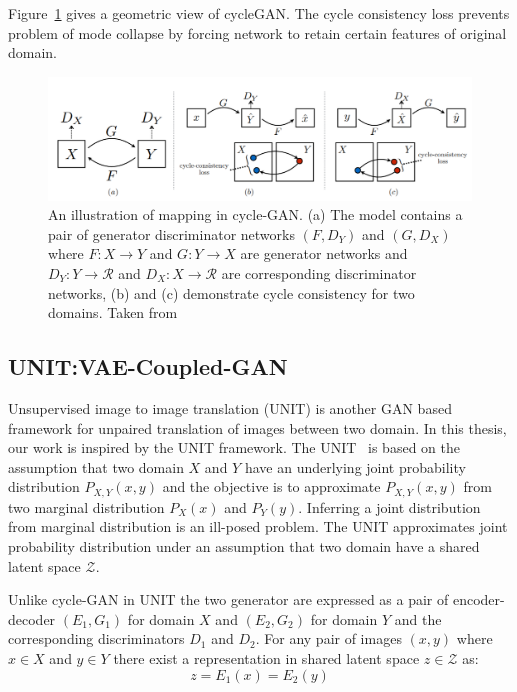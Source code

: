 Figure~\ref{fig:cycle_gan} gives a geometric view of cycleGAN. The cycle consistency loss prevents problem of mode collapse by forcing network to retain certain features of original domain.

\begin{figure}
    \centering
    \includegraphics[width=0.95\columnwidth]{master_thesis_template/figs/cycle_gan.PNG}
    \caption{An illustration of mapping in cycle-GAN. (a) The model contains a pair of generator discriminator networks $(F, D_Y)$ and $(G,D_X)$ where $F: X\rightarrow Y$ and $G: Y\rightarrow X$ are generator networks and $D_Y: Y\rightarrow \mathcal{R}$ and $D_X: X\rightarrow \mathcal{R}$ are corresponding discriminator networks, (b) and (c) demonstrate cycle consistency for two domains. Taken from~\cite{zhu2017unpaired}}
    \label{fig:cycle_gan}
\end{figure}



\subsection{UNIT:VAE-Coupled-GAN}
\label{subsec:unit_gan}
Unsupervised image to image translation (UNIT) is another GAN based framework for unpaired translation of images between two domain. In this thesis, our work is inspired by the UNIT framework. The UNIT~\cite{liu2017unsupervised} is based on the assumption that two domain $X$ and $Y$ have an underlying joint probability distribution $P_{X,Y}(x,y)$ and the objective is to approximate $P_{X,Y}(x,y)$ from two marginal distribution $P_{X}(x)$ and $P_{Y}(y)$. Inferring a joint distribution from marginal distribution is an ill-posed problem. The UNIT approximates joint probability distribution under an assumption that two domain have a shared latent space $\mathcal{Z}$. 


Unlike cycle-GAN in UNIT the two generator are expressed as a pair of encoder-decoder $(E_1,G_1)$ for domain $X$ and $(E_2,G_2)$ for domain $Y$ and the corresponding discriminators $D_1$ and $D_2$. For any pair of images $(x,y)$ where $x\in X$ and $y\in Y$ there exist a representation in shared latent space $z\in\mathcal{Z}$ as:
\begin{equation}
    z = E_1(x) = E_2(y)
\end{equation}

